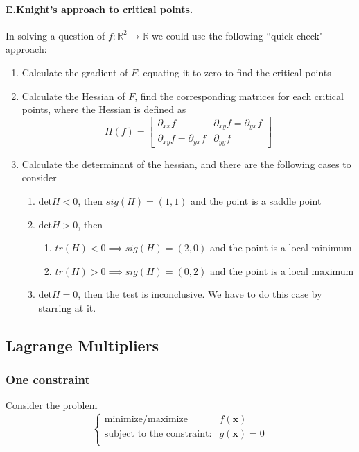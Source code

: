 \documentclass[11pt]{article}
\newcommand{\tb}[1]{\textbf{#1}}
\newcommand{\real}[0]{\mathbb{R}}
\begin{document}
\paragraph{E.Knight's approach to critical points.}In solving a question of $f:\real^2 \rightarrow{} \real$ we could use the following ``quick check" approach:
\begin{enumerate}
    \item Calculate the gradient of $F$, equating it to zero to find the critical points
    \item Calculate the Hessian of $F$, find the corresponding matrices for each critical points, where the Hessian is defined as
    \begin{equation*} H(f) = 
        \begin{bmatrix}
             \partial_{xx}f & \partial_{xy}f = \partial_{yx}f \\
             \partial_{xy}f = \partial_{yx}f & \partial_{yy}f
        \end{bmatrix}
    \end{equation*}
    \item Calculate the determinant of the hessian, and there are the following cases to consider
    \begin{enumerate}
        \item det$H<0$, then $sig(H) = (1,1)$ and the point is a saddle point
        \item det$H>0$, then
            \begin{enumerate}
                \item $tr(H)<0 \implies sig(H) = (2,0)$ and the point is a local minimum
                \item $tr(H)>0 \implies sig(H) = (0,2)$ and the point is a local maximum
            \end{enumerate}
        \item det$H=0$, then the test is inconclusive. We have to do this case by starring at it.
    \end{enumerate}
\end{enumerate}
\subsection{Lagrange Multipliers}
\subsubsection{One constraint}
Consider the problem
\begin{equation*}
\begin{cases}
  \mbox{minimize/maximize} \quad &f(\tb{x}) \\
  \mbox{subject to the constraint:} &g(\tb{x}) = 0\\
\end{cases}
\end{equation*}
\end{document}
